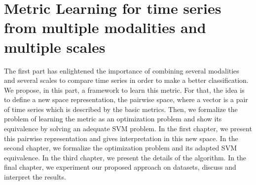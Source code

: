 \part{Metric Learning for time series from multiple modalities and multiple scales}
The first part has enlightened the importance of combining several modalities and several scales to compare time series in order to make a better classification. We propose, in this part, a framework to learn this metric. For that, the idea is to define a new space representation, the pairwise space, where a vector is a pair of time series which is described by the basic metrics. Then, we formalize the problem of learning the metric as an optimization problem and show its equivalence by solving an adequate SVM problem. In the first chapter, we present this pairwise representation and gives interpretation in this new space. In the second chapter, we formalize the optimization problem and its adapted SVM equivalence. In the third chapter, we present the details of the algorithm. In the final chapter, we experiment our proposed approach on datasets, discuss and interpret the results.

